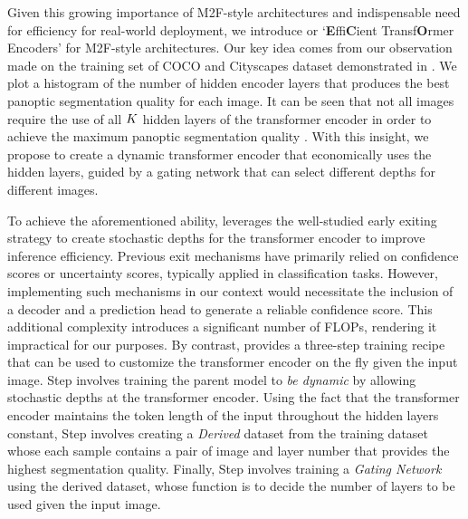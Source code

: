 Given this growing importance of M2F-style architectures and indispensable need for efficiency for real-world deployment, we introduce \ours or `\textbf{E}ffi\textbf{C}ient Transf\textbf{O}rmer Encoders' for M2F-style architectures. Our key idea  comes from our observation made on the training set of COCO \cite{lin2014microsoft} and Cityscapes \cite{cordts2016cityscapes} dataset demonstrated in . We plot a histogram of the number of hidden encoder layers that produces the best panoptic segmentation quality \cite{kirillov2019panoptic} for each image. It can be seen that not all images require the use of all $K$ hidden layers of the transformer encoder in order to achieve the maximum panoptic segmentation quality \cite{kirillov2019panoptic}. With this insight, we propose to create a dynamic transformer encoder that economically uses the hidden layers, guided by a gating network that can select different depths for different images.

To achieve the aforementioned ability, \ours leverages the well-studied early exiting strategy \cite{tang2023you, xu2023lgvit, liu2021mevt, wang2022single, jiang2023multi, yang2023exploiting, valade2024eero, tang2023need, zhang2023adaptive} to create stochastic depths for the transformer encoder to improve inference efficiency. Previous exit mechanisms have primarily relied on confidence scores or uncertainty scores, typically applied in classification tasks. However, implementing such mechanisms in our context would necessitate the inclusion of a decoder and a prediction head to generate a reliable confidence score. This additional complexity introduces a significant number of FLOPs, rendering it impractical for our purposes. By contrast, \ours provides a three-step training recipe that can be used to customize the transformer encoder on the fly given the input image. Step \stepA involves training the parent model to \textit{be dynamic} by allowing stochastic depths at the transformer encoder. Using the fact that the transformer encoder maintains the token length of the input throughout the hidden layers  constant,  Step \stepB involves creating a \textit{Derived} dataset from the training dataset whose each sample contains a pair of image and layer number that provides the highest segmentation quality. Finally, Step \stepC involves training a \textit{Gating Network} using the derived dataset, whose function is to decide the number of layers to be used given the input image. 

